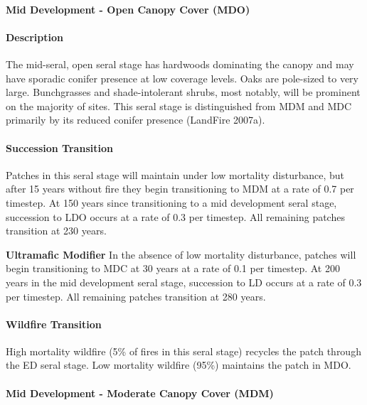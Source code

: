 \noindent\hrulefill


\paragraph{Mid Development - Open Canopy Cover (MDO)}

\paragraph{Description} The mid-seral, open seral stage has hardwoods dominating the canopy and may have sporadic conifer presence at low coverage levels. Oaks are pole-sized to very large. Bunchgrasses and shade-intolerant shrubs, most notably, will be prominent on the majority of sites. This seral stage is distinguished from MDM and MDC primarily by its reduced conifer presence (LandFire 2007a).

\paragraph{Succession Transition} Patches in this seral stage will maintain under low mortality disturbance, but after 15 years without fire they begin transitioning to MDM at a rate of 0.7 per timestep. At 150 years since transitioning to a mid development seral stage, succession to LDO occurs at a rate of 0.3 per timestep. All remaining patches transition at 230 years. 
\begin{adjustwidth}{2cm}{}
\medskip

\textbf{Ultramafic Modifier}  In the absence of low mortality disturbance, patches will begin transitioning to MDC at 30 years at a rate of 0.1 per timestep. At 200 years in the mid development seral stage, succession to LD occurs at a rate of 0.3 per timestep. All remaining patches transition at 280 years.

\end{adjustwidth}
\paragraph{Wildfire Transition}
High mortality wildfire (5\% of fires in this seral stage) recycles the patch through the ED seral stage. Low mortality wildfire (95\%) maintains the patch in MDO.

\noindent\hrulefill

\paragraph{Mid Development - Moderate Canopy Cover (MDM)}

